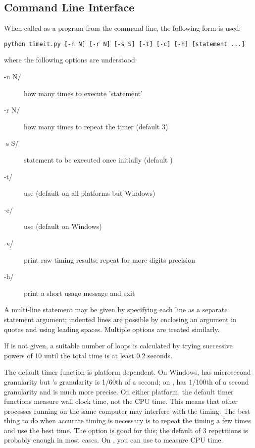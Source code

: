 \subsection{Command Line Interface}

When called as a program from the command line, the following form is used:

\begin{verbatim}
python timeit.py [-n N] [-r N] [-s S] [-t] [-c] [-h] [statement ...]
\end{verbatim}

where the following options are understood:

\begin{description}
\item[-n N/] how many times to execute 'statement'
\item[-r N/] how many times to repeat the timer (default 3)
\item[-s S/] statement to be executed once initially (default
)
\item[-t/] use 
(default on all platforms but Windows)
\item[-c/] use  (default on Windows)
\item[-v/] print raw timing results; repeat for more digits
precision
\item[-h/] print a short usage message and exit
\end{description}

A multi-line statement may be given by specifying each line as a
separate statement argument; indented lines are possible by enclosing
an argument in quotes and using leading spaces.  Multiple
 options are treated similarly.

If  is not given, a suitable number of loops is
calculated by trying successive powers of 10 until the total time is
at least 0.2 seconds.

The default timer function is platform dependent.  On Windows,
 has microsecond granularity but
's granularity is 1/60th of a second; on \UNIX,
 has 1/100th of a second granularity and
 is much more precise.  On either platform, the
default timer functions measure wall clock time, not the CPU time.
This means that other processes running on the same computer may
interfere with the timing.  The best thing to do when accurate timing
is necessary is to repeat the timing a few times and use the best
time.  The  option is good for this; the default of 3
repetitions is probably enough in most cases.  On \UNIX, you can use
 to measure CPU time.

